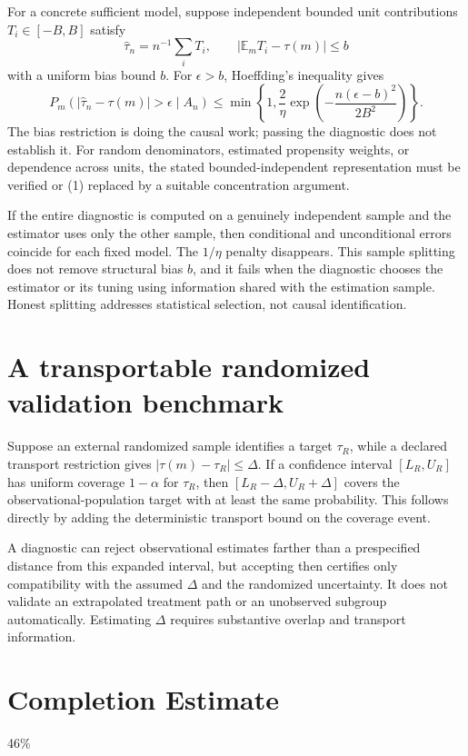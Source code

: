 \documentclass[11pt]{article}
\newcommand{\E}{\mathbb E}
\begin{document}
For a concrete sufficient model, suppose independent bounded unit contributions $T_i\in[-B,B]$ satisfy
\[
 \widehat\tau_n=n^{-1}\sum_iT_i,
 \qquad |\E_mT_i-\tau(m)|\leq b
\]
with a uniform bias bound $b$. For $\epsilon>b$, Hoeffding's inequality gives
\[
 P_m(|\widehat\tau_n-\tau(m)|>\epsilon\mid A_n)
 \leq\min\left\{1,\frac{2}{\eta}
 \exp\left(-\frac{n(\epsilon-b)^2}{2B^2}\right)\right\}. \tag{1}
\]
The bias restriction is doing the causal work; passing the diagnostic does not establish it. For random denominators, estimated propensity weights, or dependence across units, the stated bounded-independent representation must be verified or (1) replaced by a suitable concentration argument.

If the entire diagnostic is computed on a genuinely independent sample and the estimator uses only the other sample, then conditional and unconditional errors coincide for each fixed model. The $1/\eta$ penalty disappears. This sample splitting does not remove structural bias $b$, and it fails when the diagnostic chooses the estimator or its tuning using information shared with the estimation sample. Honest splitting addresses statistical selection, not causal identification.

\section*{A transportable randomized validation benchmark}
Suppose an external randomized sample identifies a target $\tau_R$, while a declared transport restriction gives $|\tau(m)-\tau_R|\leq\Delta$. If a confidence interval $[L_R,U_R]$ has uniform coverage $1-\alpha$ for $\tau_R$, then $[L_R-\Delta,U_R+\Delta]$ covers the observational-population target with at least the same probability. This follows directly by adding the deterministic transport bound on the coverage event.

A diagnostic can reject observational estimates farther than a prespecified distance from this expanded interval, but accepting then certifies only compatibility with the assumed $\Delta$ and the randomized uncertainty. It does not validate an extrapolated treatment path or an unobserved subgroup automatically. Estimating $\Delta$ requires substantive overlap and transport information.

\section{Completion Estimate}
46\%
\end{document}
